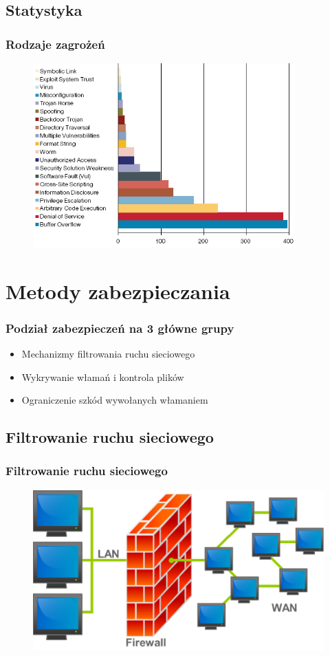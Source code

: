 \documentclass{beamer}
\begin{document}
\subsection{Statystyka}
\begin{frame}
	\frametitle{Rodzaje zagrożeń}
	\begin{figure}[H]
	\centering
	\includegraphics[width=0.9\textwidth]{overflow.png}
	\end{figure}
\end{frame}

\section{Metody zabezpieczania}
\begin{frame}
	\frametitle{Podział zabezpieczeń na 3 główne grupy}	
	\begin{itemize}
	\item Mechanizmy filtrowania ruchu sieciowego
	\item Wykrywanie włamań i kontrola plików
	\item Ograniczenie szkód wywołanych włamaniem
	\end{itemize}
\end{frame}

\subsection{Filtrowanie ruchu sieciowego}
	\begin{frame}
	\frametitle{Filtrowanie ruchu sieciowego}
	\begin{figure}[H]
	\centering
	\includegraphics[width=1\textwidth]{firewall.png}
	\end{figure}
\end{frame}
\end{document}
